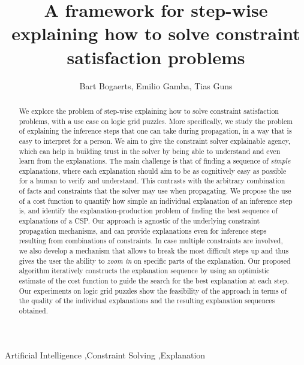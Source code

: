 \documentclass[3p]{elsarticle}
\begin{document}
\begin{frontmatter}

\title{A framework for step-wise explaining how to solve constraint satisfaction problems}

\author[mymainaddress]{Bart Bogaerts, Emilio Gamba, Tias Guns}
\address{Vrije Universiteit Brussel, Pleinlaan 2, 1050 Brussel, Belgium}

\begin{abstract}
We explore the problem of step-wise explaining how to solve constraint satisfaction problems, with a use case on logic grid puzzles.
More specifically, we study the problem of explaining the inference steps that one can take during propagation, in a way that is easy to interpret for a person.
We aim to give the constraint solver explainable agency, which can help in building trust in the solver by being able to understand and even learn from the explanations.
The main challenge is that of finding a sequence of \textit{simple} explanations, where each explanation should aim to be as cognitively easy as possible for a human to verify and understand. 
This contrasts with the arbitrary combination of facts and constraints that the solver may use when propagating.
We propose the use of a cost function to quantify how simple an individual explanation of an inference step is, and identify the explanation-production problem of finding the best sequence of explanations of a CSP. 
Our approach is agnostic of the underlying constraint propagation mechanisms, and can provide explanations even for inference steps resulting from combinations of constraints. 
In case multiple constraints are involved, we also develop a mechanism that allows to break the most difficult steps up and thus gives the user the ability to \emph{zoom in} on specific parts of the explanation. 
Our proposed algorithm iteratively constructs the explanation sequence by using an optimistic estimate of the cost function to guide the search for the best explanation at each step.
Our experiments on logic grid puzzles show the feasibility of the approach in terms of the quality of the individual explanations and the resulting explanation sequences obtained.
\end{abstract}

\begin{keyword}
Artificial Intelligence \sep Constraint Solving \sep Explanation
\end{keyword}

\end{frontmatter}
\end{document}
